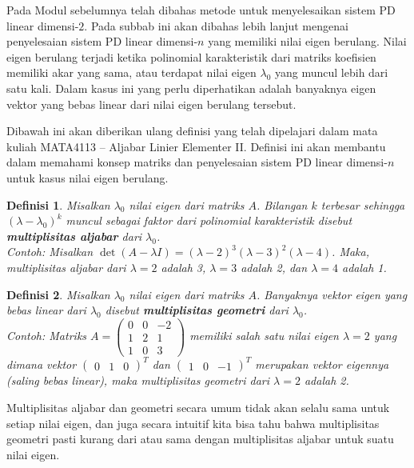 \documentclass[a4paper]{article}
\theoremstyle{definisi}
\newtheorem{definisi}{Definisi}[section]
\numberwithin{equation}{section}
\begin{document}
  Pada Modul sebelumnya telah dibahas metode untuk menyelesaikan sistem PD linear dimensi-$2$. Pada subbab ini akan dibahas lebih lanjut mengenai penyelesaian sistem PD linear dimensi-$n$ yang memiliki nilai eigen berulang. Nilai eigen berulang terjadi ketika polinomial karakteristik dari matriks koefisien memiliki akar yang sama, atau terdapat nilai eigen $\lambda_0$ yang muncul lebih dari satu kali. Dalam kasus ini yang perlu diperhatikan adalah banyaknya eigen vektor yang bebas linear dari nilai eigen berulang tersebut.

  Dibawah ini akan diberikan ulang definisi yang telah dipelajari dalam mata kuliah MATA4113 -- Aljabar Linier Elementer II. Definisi ini akan membantu dalam memahami konsep matriks dan penyelesaian sistem PD linear dimensi-$n$ untuk kasus nilai eigen berulang.
  \begin{definisi}
    Misalkan $\lambda_0$ nilai eigen dari matriks $A$. Bilangan $k$ terbesar sehingga $(\lambda-\lambda_0)^k$ muncul sebagai faktor dari polinomial karakteristik disebut \textbf{multiplisitas aljabar} dari $\lambda_0$.\\

    \noindent Contoh: Misalkan $\det(A-\lambda I)=(\lambda-2)^3(\lambda-3)^2(\lambda-4)$. Maka, multiplisitas aljabar dari $\lambda=2$ adalah 3, $\lambda=3$ adalah 2, dan $\lambda=4$ adalah 1.
  \end{definisi}
  
  \begin{definisi}
    Misalkan $\lambda_0$ nilai eigen dari matriks $A$. Banyaknya vektor eigen yang bebas linear dari $\lambda_0$ disebut \textbf{multiplisitas geometri} dari $\lambda_0$.\\

    \noindent Contoh: Matriks $A=\begin{pmatrix}
      0&0&-2\\
      1&2&1\\
      1&0&3
    \end{pmatrix}$ memiliki salah satu nilai eigen $\lambda=2$ yang dimana vektor $\begin{pmatrix}0&1&0\end{pmatrix}^T$ dan $\begin{pmatrix}1&0&-1\end{pmatrix}^T$ merupakan vektor eigennya (saling bebas linear), maka multiplisitas geometri dari $\lambda=2$ adalah 2.
  \end{definisi}

  Multiplisitas aljabar dan geometri secara umum tidak akan selalu sama untuk setiap nilai eigen, dan juga secara intuitif kita bisa tahu bahwa multiplisitas geometri pasti kurang dari atau sama dengan multiplisitas aljabar untuk suatu nilai eigen. 
\end{document}
